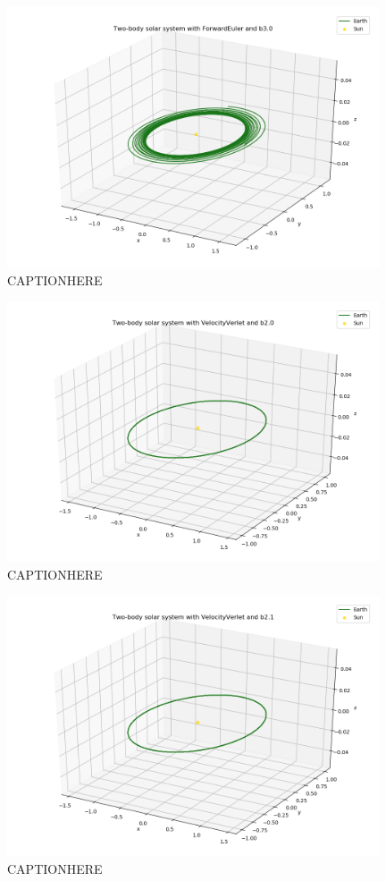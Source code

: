 \documentclass{article}
\begin{document}
    \begin{figure}[H]
        \centering
        \includegraphics[width = 11cm]{img/plot3D_S_E_F_b30.png}
        \caption{CAPTIONHERE}
        \label{fig:plot3D_S_E_F_b30}
    \end{figure}

    \begin{figure}[H]
        \centering
        \includegraphics[width = 11cm]{img/plot3D_S_E_V_b20.png}
        \caption{CAPTIONHERE}
        \label{fig:plot3D_S_E_V_b20}
    \end{figure}

    \begin{figure}[H]
        \centering
        \includegraphics[width = 11cm]{img/plot3D_S_E_V_b21.png}
        \caption{CAPTIONHERE}
        \label{fig:plot3D_S_E_V_b21}
    \end{figure}
\end{document}
